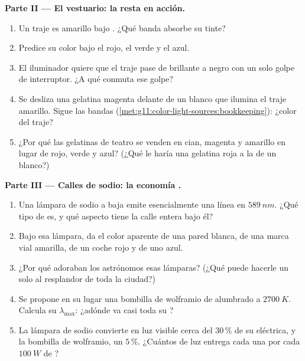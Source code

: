 \begin{problem}
\medskip
\noindent\textbf{Parte II --- El vestuario: la resta en acción.}
\begin{enumerate}[resume]
  \item Un traje es amarillo bajo . ¿Qué banda absorbe su
        tinte?
  \item Predice su color bajo el  rojo, el verde y el azul.
  \item El iluminador quiere que el traje pase de brillante a negro con
        un solo golpe de interruptor. ¿A qué  conmuta ese golpe?
  \item Se desliza una gelatina magenta delante de un  blanco que
        ilumina el traje amarillo. Sigue las bandas
        (\cref{met:g11:color-light-sources:bookkeeping}): ¿color del
        traje?
  \item ¿Por qué las gelatinas de teatro se venden en cian, magenta y
        amarillo en lugar de rojo, verde y azul? (¿Qué le haría una
        gelatina roja a la  de un  blanco?)
\end{enumerate}

\medskip
\noindent\textbf{Parte III --- Calles de sodio: la economía
.}
\begin{enumerate}[resume]
  \item Una lámpara de sodio a baja  emite esencialmente una
        línea en $\qty{589}{nm}$. ¿Qué tipo de  es, y qué
        aspecto tiene la calle entera bajo él?
  \item Bajo esa lámpara, da el color aparente de una pared blanca, de
        una marca vial amarilla, de un coche rojo y de uno azul.
  \item ¿Por qué adoraban los astrónomos esas lámparas? (¿Qué puede
        hacerle un solo  al resplandor de toda la ciudad?)
  \item Se propone en su lugar una bombilla de wolframio de alumbrado a
        $\qty{2700}{K}$. Calcula su $\lambda_{\max}$: ¿adónde va casi
        toda su ?
  \item La lámpara de sodio convierte en luz visible cerca del $30\,\%$ de
        su  eléctrica, y la bombilla de wolframio, un $5\,\%$.
        ¿Cuántos  de luz entrega cada una por cada
        $\qty{100}{W}$ de ?
\end{enumerate}


\end{problem}
